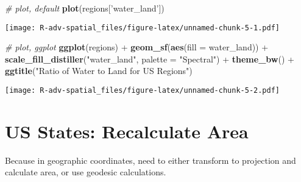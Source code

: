 \documentclass[]{book}
\newenvironment{Shaded}{\begin{snugshade}}{\end{snugshade}}
\newcommand{\KeywordTok}[1]{\textcolor[rgb]{0.13,0.29,0.53}{\textbf{{#1}}}}
\newcommand{\DataTypeTok}[1]{\textcolor[rgb]{0.13,0.29,0.53}{{#1}}}
\newcommand{\DecValTok}[1]{\textcolor[rgb]{0.00,0.00,0.81}{{#1}}}
\newcommand{\StringTok}[1]{\textcolor[rgb]{0.31,0.60,0.02}{{#1}}}
\newcommand{\CommentTok}[1]{\textcolor[rgb]{0.56,0.35,0.01}{\textit{{#1}}}}
\newcommand{\OtherTok}[1]{\textcolor[rgb]{0.56,0.35,0.01}{{#1}}}
\newcommand{\NormalTok}[1]{{#1}}
\begin{document}
\begin{Shaded}
\begin{Highlighting}[]
\CommentTok{# plot, default}
\KeywordTok{plot}\NormalTok{(regions[}\StringTok{'water_land'}\NormalTok{])}
\end{Highlighting}
\end{Shaded}

\texttt{[image: R-adv-spatial\_files/figure-latex/unnamed-chunk-5-1.pdf]}

\begin{Shaded}
\begin{Highlighting}[]
\CommentTok{# plot, ggplot}
\KeywordTok{ggplot}\NormalTok{(regions) +}
\StringTok{  }\KeywordTok{geom_sf}\NormalTok{(}\KeywordTok{aes}\NormalTok{(}\DataTypeTok{fill =} \NormalTok{water_land)) +}
\StringTok{  }\KeywordTok{scale_fill_distiller}\NormalTok{(}\StringTok{"water_land"}\NormalTok{, }\DataTypeTok{palette =} \StringTok{"Spectral"}\NormalTok{) +}
\StringTok{  }\KeywordTok{theme_bw}\NormalTok{() +}
\StringTok{  }\KeywordTok{ggtitle}\NormalTok{(}\StringTok{"Ratio of Water to Land for US Regions"}\NormalTok{)}
\end{Highlighting}
\end{Shaded}

\texttt{[image: R-adv-spatial\_files/figure-latex/unnamed-chunk-5-2.pdf]}

\section{US States: Recalculate Area}\label{us-states-recalculate-area}

Because in geographic coordinates, need to either transform to
projection and calculate area, or use geodesic calculations.

\begin{Shaded}
\end{Shaded}
\end{document}
